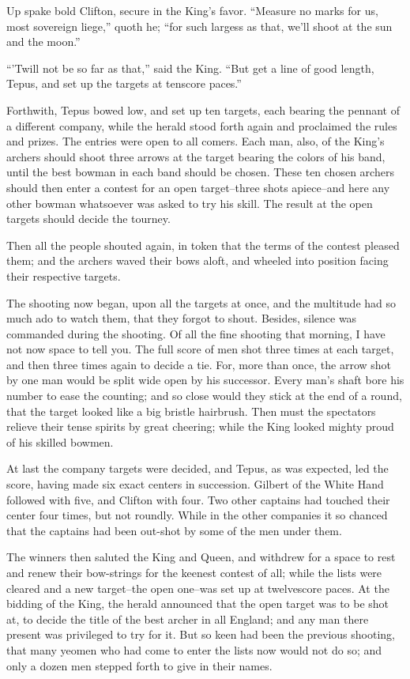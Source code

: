 Up spake bold Clifton, secure in the King's favor. ``Measure no marks
for us, most sovereign liege,'' quoth he; ``for such largess as that,
we'll shoot at the sun and the moon.''

``'Twill not be so far as that,'' said the King. ``But get a line of
good length, Tepus, and set up the targets at tenscore paces.''

Forthwith, Tepus bowed low, and set up ten targets, each bearing the
pennant of a different company, while the herald stood forth again and
proclaimed the rules and prizes. The entries were open to all comers.
Each man, also, of the King's archers should shoot three arrows at the
target bearing the colors of his band, until the best bowman in each
band should be chosen. These ten chosen archers should then enter a
contest for an open target--three shots apiece--and here any other
bowman whatsoever was asked to try his skill. The result at the open
targets should decide the tourney.

Then all the people shouted again, in token that the terms of the
contest pleased them; and the archers waved their bows aloft, and
wheeled into position facing their respective targets.

The shooting now began, upon all the targets at once, and the multitude
had so much ado to watch them, that they forgot to shout. Besides,
silence was commanded during the shooting. Of all the fine shooting that
morning, I have not now space to tell you. The full score of men shot
three times at each target, and then three times again to decide a tie.
For, more than once, the arrow shot by one man would be split wide open
by his successor. Every man's shaft bore his number to ease the
counting; and so close would they stick at the end of a round, that the
target looked like a big bristle hairbrush. Then must the spectators
relieve their tense spirits by great cheering; while the King looked
mighty proud of his skilled bowmen.

At last the company targets were decided, and Tepus, as was expected,
led the score, having made six exact centers in succession. Gilbert of
the White Hand followed with five, and Clifton with four. Two other
captains had touched their center four times, but not roundly. While in
the other companies it so chanced that the captains had been out-shot by
some of the men under them.

The winners then saluted the King and Queen, and withdrew for a space to
rest and renew their bow-strings for the keenest contest of all; while
the lists were cleared and a new target--the open one--was set up at
twelvescore paces. At the bidding of the King, the herald announced that
the open target was to be shot at, to decide the title of the best
archer in all England; and any man there present was privileged to try
for it. But so keen had been the previous shooting, that many yeomen who
had come to enter the lists now would not do so; and only a dozen men
stepped forth to give in their names.

